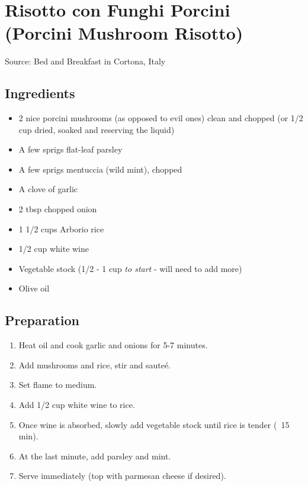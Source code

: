 \section{Risotto con Funghi Porcini (Porcini Mushroom Risotto)}

\begin{center}
Source: Bed and Breakfast in Cortona, Italy
\end{center}

\subsection{Ingredients}
\begin{multicols}{2}
\begin{itemize}
    \item 2 nice porcini mushrooms (as opposed to evil ones) clean and chopped
         (or 1/2 cup dried, soaked and reserving the liquid)
    \item A few sprigs flat-leaf parsley
    \item A few sprigs mentuccia (wild mint), chopped
    \item A clove of garlic
    \item 2 tbsp chopped onion
    \item 1 1/2 cups Arborio rice
    \item 1/2 cup white wine
    \item Vegetable stock (1/2 - 1 cup \emph{to start} - will need to add more)
    \item Olive oil
\end{itemize}
\end{multicols}

\subsection{Preparation}
\begin{enumerate}
    \item Heat oil and cook garlic and onions for 5-7 minutes.
    \item Add mushrooms and rice, stir and saute\'{e}.
    \item Set flame to medium.
    \item Add 1/2 cup white wine to rice.
    \item Once wine is absorbed, slowly add vegetable stock until rice is tender (~15 min).
    \item At the last minute, add parsley and mint.
    \item Serve immediately (top with parmesan cheese if desired).
\end{enumerate}
